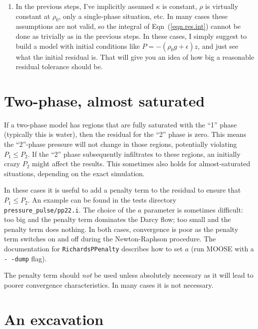 \documentclass[]{scrreprt}
\begin{document}
\begin{enumerate}
  ``boring'' region can be thought of as virtually zero, while the
  residual in the ``interesting'' region is
  $V_{\mathrm{interesting}}|\kappa|\rho_{0}\epsilon/\mu$.  This is smaller
  than the residual in the previous step, so provides a tighter
  tolerance for MOOSE to strive towards.
\item In the previous steps, I've implicitly assumed $\kappa$ is
  constant, $\rho$ is virtually constant at $\rho_{0}$, only a
  single-phase situation, etc.  In many cases these assumptions are
  not valid, so the integral of Eqn~(\ref{eqn.res.int}) cannot be done
  as trivially as in the previous steps.  In these cases, I simply
  suggest to build a model with initial conditions like $P =
  -(\rho_{0} g + \epsilon)z$, and just see what the initial residual is.
  That will give you an idea of how big a reasonable residual
  tolerance should be.
\end{enumerate}


\section{Two-phase, almost saturated}

If a two-phase model has regions that are fully saturated with the
``1'' phase (typically this is water), then the residual for the ``2''
phase is zero.  This means the ``2''-phase pressure will not change in
those regions, potentially violating $P_{1}\leq P_{2}$.  If the ``2''
phase subsequently infiltrates to these regions, an initially crazy
$P_{2}$ might affect the results.  This sometimes also holds for
almost-saturated situations, depending on the exact simulation.

In these cases it is useful to add a penalty term to the residual to
ensure that $P_{1}\leq P_{2}$.  An example can be found in the tests
directory {\tt pressure\_pulse/pp22.i}.  The choice of the $a$
parameter is sometimes difficult: too big and the penalty term
dominates the Darcy flow; too small and the penalty term does
nothing.  In both cases, convergence is poor as the penalty term
switches on and off during the Newton-Raphson procedure.  The
documentation for {\tt RichardsPPenalty} describes how to set $a$ (run
MOOSE with a {\tt -\,-dump} flag).

The penalty term should {\em not} be used unless absolutely necessary
as it will lead to poorer convergence characteristics.  In many cases
it is not necessary.

\section{An excavation}
\end{document}
